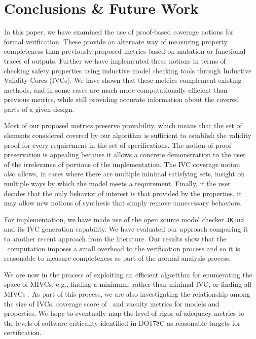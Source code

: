 \section{Conclusions \& Future Work}
\label{sec:conclusion}

In this paper, we have examined the use of proof-based coverage notions for formal verification.  These provide an alternate way of measuring property completeness than previously proposed metrics based on mutation or functional traces of outputs.
Further we have implemented these notions in terms of checking safety properties using inductive model checking tools through Inductive Validity Cores (IVCs).  We have shown that these metrics complement existing methods, and in some cases are much more computationally efficient than previous metrics, while still providing accurate information about the covered parts of a given design.

Most of our proposed metrics preserve provability, which means that the set of elements considered covered by our algorithm is sufficient to establish the validity proof for every requirement in the set of specifications.  The notion of proof preservation is appealing because it allows a concrete demonstration to the user of the irrelevance of portions of the implementation.  The IVC coverage notion also allows, in cases where there are multiple minimal satisfying sets, insight on multiple ways by which the model meets a requirement.
Finally, if the user decides that the only behavior of interest is that provided by the properties, it may allow new notions of synthesis that simply remove unnecessary behaviors.

For implementation, we have made use of the open source model checker \texttt{JKind} and its IVC generation capability. We have evaluated our approach comparing it to another recent approach from the literature.  Our results show that the \ivccov\ computation imposes a small overhead to the verification process and so it is reasonable to measure completeness as part of the normal analysis process.

We are now in the process of exploiting an efficient algorithm for enumerating the space of MIVCs, e.g., finding a minimum, rather than minimal IVC, or finding all MIVCs \cite{ghass17}. As part of this process, we are also investigating the relationship among the size of IVCs, coverage score of \ivccov\, and vacuity metrics for models and properties.  We hope to eventually map the level of rigor of adequacy metrics to the levels of software criticality identified in DO178C as reasonable targets for certification.

